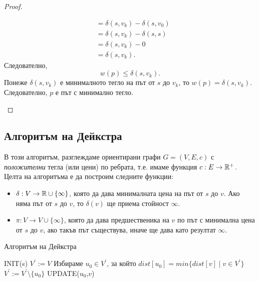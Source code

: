 \begin{proof}
\begin{enumerate}[1)]
\begin{itemize}
\begin{align*}
        & = \delta(s,v_k) - \delta(s,v_0)\\
        & = \delta(s,v_k) - \delta(s,s)\\
        & = \delta(s,v_k) - 0\\
        & = \delta(s,v_k).
      \end{align*}
      Следователно, 
      \[w(p) \leq \delta(s,v_k).\]
      Понеже $\delta(s,v_k)$ е минималното тегло на път от $s$ до $v_k$,
      то $w(p) = \delta(s,v_k)$.
      Следователно, $p$ е път с минимално тегло.
    \end{itemize}
  \end{enumerate}
\end{proof}




\subsection{Алгоритъм на Дейкстра}

В този алгоритъм, разглеждаме ориентирани графи $G = (V,E,c)$ с {\em положителни} тегла (или цени) по ребрата, т.е. 
имаме функция $c:E\to\mathbb{R}^+$. 
Целта на алгоритъма е да построим следните функции:
\begin{itemize}
\item 
  $\delta: V\to\mathbb{R}\cup\{\infty\}$, 
  която да дава минималната цена на път от $s$ до $v$. Ако няма път от $s$ до $v$, то $\delta(v)$
  ще приема стойност $\infty$.
\item
  $\pi:V\to V\cup\{\infty\}$, която да дава предшественика на $v$ по път с минимална цена от $s$ до $v$,
  ако такъв път съществува, иначе ще дава като резултат $\infty$.
\end{itemize}

\begin{algorithm}
\caption{Алгоритъм на Дейкстра}
\label{alg:dijkstra}

\begin{algorithmic}[1]
  \STATE INIT(s)
  \STATE $V^\prime := V$
  \STATE Избираме $u_0\in V^\prime$, за който $ dist[u_0] = min\{dist[v] \mid v\in V^\prime\} $
  \STATE $V^\prime := V^\prime\setminus\{u_0\}$
  \STATE UPDATE($u_0$,$v$)
  \ENDIF
  \ENDFOR
  \ENDWHILE
\end{algorithmic}
\end{algorithm}

